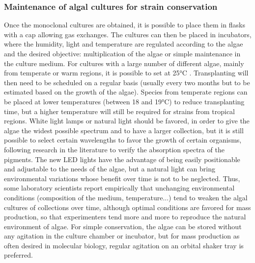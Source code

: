 \subsubsection{Maintenance of algal cultures for strain conservation}
Once the monoclonal cultures are obtained, it is possible to place them in flasks with a cap allowing gas exchanges. The cultures can then be placed in incubators, where the humidity, light and temperature are regulated according to the algae and the desired objective: multiplication of the algae or simple maintenance in the culture medium. For cultures with a large number of different algae, mainly from temperate or warm regions, it is possible to set at 25°C \parencite{Georgianna2012}. Transplanting will then need to be scheduled on a regular basis (usually every two months but to be estimated based on the growth of the algae). Species from temperate regions can be placed at lower temperatures (between 18 and 19°C) to reduce transplanting time, but a higher temperature will still be required for strains from tropical regions. White light lamps or natural light should be favored, in order to give the algae the widest possible spectrum and to have a larger collection, but it is still possible to select certain wavelengths to favor the growth of certain organisms, following research in the literature to verify the absorption spectra of the pigments. The new LED lights have the advantage of being easily positionable and adjustable to the needs of the algae, but a natural light can bring environmental variations whose benefit over time is not to be neglected. Thus, some laboratory scientists report empirically that unchanging environmental conditions (composition of the medium, temperature...) tend to weaken the algal cultures of collections over time, although optimal conditions are favored for mass production, so that experimenters tend more and more to reproduce the natural environment of algae. For simple conservation, the algae can be stored without any agitation in the culture chamber or incubator, but for mass production as often desired in molecular biology, regular agitation on an orbital shaker tray is preferred.
